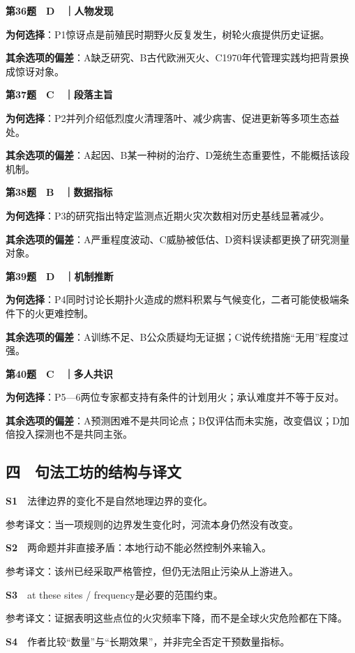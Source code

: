 \documentclass[
  11pt,
]{ctexart}
\begin{document}
\textbf{第36题　D　｜人物发现}

\textbf{为何选择}：P1惊讶点是前殖民时期野火反复发生，树轮火痕提供历史证据。

\textbf{其余选项的偏差}：A缺乏研究、B古代欧洲灭火、C1970年代管理实践均把背景换成惊讶对象。

\textbf{第37题　C　｜段落主旨}

\textbf{为何选择}：P2并列介绍低烈度火清理落叶、减少病害、促进更新等多项生态益处。

\textbf{其余选项的偏差}：A起因、B某一种树的治疗、D笼统生态重要性，不能概括该段机制。

\textbf{第38题　B　｜数据指标}

\textbf{为何选择}：P3的研究指出特定监测点近期火灾次数相对历史基线显著减少。

\textbf{其余选项的偏差}：A严重程度波动、C威胁被低估、D资料误读都更换了研究测量对象。

\textbf{第39题　D　｜机制推断}

\textbf{为何选择}：P4同时讨论长期扑火造成的燃料积累与气候变化，二者可能使极端条件下的火更难控制。

\textbf{其余选项的偏差}：A训练不足、B公众质疑均无证据；C说传统措施``无用''程度过强。

\textbf{第40题　C　｜多人共识}

\textbf{为何选择}：P5---6两位专家都支持有条件的计划用火；承认难度并不等于反对。

\textbf{其余选项的偏差}：A预测困难不是共同论点；B仅评估而未实施，改变倡议；D加倍投入探测也不是共同主张。

\subsection{四　句法工坊的结构与译文}\label{ux56db-ux53e5ux6cd5ux5de5ux574aux7684ux7ed3ux6784ux4e0eux8bd1ux6587}

\textbf{S1}　法律边界的变化不是自然地理边界的变化。

参考译文：当一项规则的边界发生变化时，河流本身仍然没有改变。

\textbf{S2}　两命题并非直接矛盾：本地行动不能必然控制外来输入。

参考译文：该州已经采取严格管控，但仍无法阻止污染从上游进入。

\textbf{S3}　at these sites / frequency是必要的范围约束。

参考译文：证据表明这些点位的火灾频率下降，而不是全球火灾危险都在下降。

\textbf{S4}　作者比较``数量''与``长期效果''，并非完全否定干预数量指标。
\end{document}
